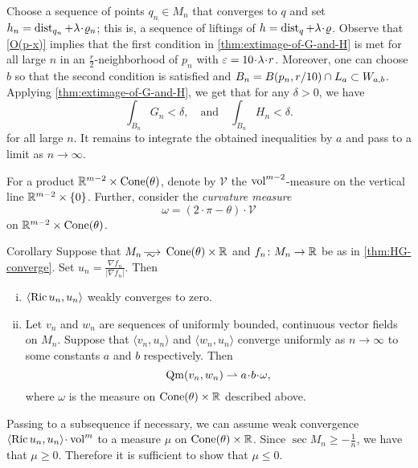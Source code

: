 Choose a sequence of points $q_n\in M_n$ that converges to $q$ and set $h_n\zz=\dist_{q_n}+\lambda\cdot \rho_n$;
this is, a sequence of liftings of $h=\dist_q+\lambda\cdot \rho$. 
Observe that \ref{O(p-x)} implies that the first condition in \ref{thm:extimage-of-G-and-H} is met for all large $n$ in an $\tfrac r2$-neighborhood of $p_n$ with $\eps=10\cdot\lambda\cdot r$.
Moreover, one can choose $b$ so that the second condition is satisfied and $B_n=B(p_n,r/10)\cap L_a\zz\subset W_{a,b}$.
Applying \ref{thm:extimage-of-G-and-H}, we get that for any $\delta>0$, we have 
\[
\int_{B_n}G_n<\delta,
\quad\text{and}\quad
\int_{B_n}H_n<\delta.
\]
for all large $n$.
It remains to integrate the obtained inequalities by $a$ and pass to a limit as $n\to\infty$.
\qeds

For a product $\mathbb{R}^{m-2}\times \operatorname{Cone}(\theta)$, denote by $\mathcal{V}$ the $\operatorname{vol}^{m-2}$-measure on the vertical line $\mathbb{R}^{m-2}\times \{0\}$.
Further, consider the \emph{curvature measure} 
\[\omega=(2\cdot\pi-\theta)\cdot \mathcal{V}\]
on $\mathbb{R}^{m-2}\times \operatorname{Cone}(\theta)$. 


\begin{thm}{Corollary}\label{cor:Ricci}
Suppose that $M_n\smooths{}  \Cone(\theta)\times \RR$ and $f_n\colon M_n\to \mathbb{R}$ be as in \ref{thm:HG-converge}.
Set $u_n=\tfrac{\nabla f_n}{|\nabla f_n|}$.
Then 

\begin{enumerate}[(i)]
\item\label{cor:Ricci:Ricci} $\langle \operatorname{\rm Ric} u_n,u_n\rangle$ weakly converges to zero.
\item\label{cor:Ricci:vw}
Let $v_n$ and $w_n$ are sequences of uniformly bounded, continuous vector fields on $M_n$.
Suppose that $\langle v_n,u_n\rangle$ and $\langle w_n,u_n\rangle$ converge uniformly as $n\to \infty$ to some constants $a$ and $b$ respectively.
Then 
\[\Qm(v_n,w_n)\rightharpoonup a\cdot b\cdot \omega,\]
where $\omega$ is the measure on $\operatorname{Cone}(\theta)\times \mathbb{R}$  described above.

\end{enumerate}

\end{thm}

Passing to a subsequence if necessary, we can assume weak convergence $\langle \Ric u_n,u_n\rangle\cdot\vol^m$ to a measure $\mu$ on $\operatorname{Cone}(\theta)\times \mathbb{R}$.
Since $\sec M_n\ge -\tfrac1n$, we have that $\mu\ge 0$.
Therefore it is sufficient to show that $\mu\le 0$.

